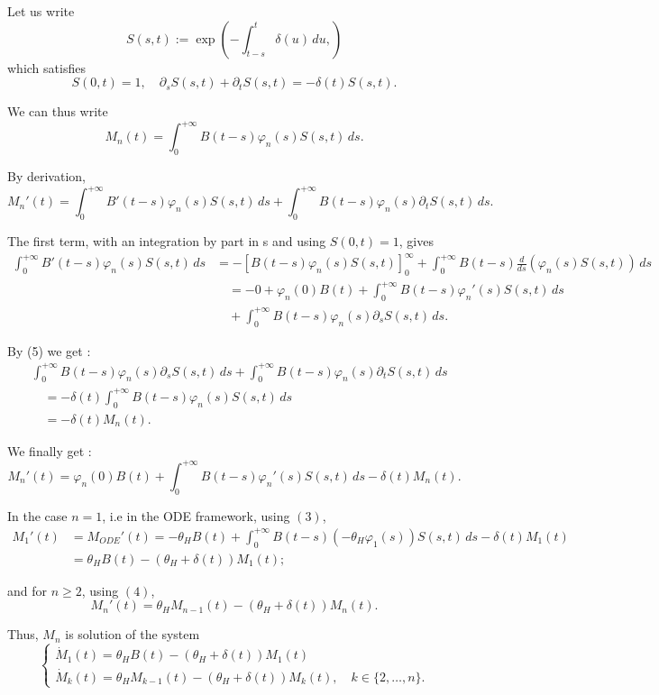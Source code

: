 \documentclass[12pt,a4paper,onecolumn]{article}
\begin{document}
Let us write 
\[
S(s, t) := \exp\left( -\int_{t-s}^{t} \delta(u) \, du, \right)
\]
which satisfies
\begin{equation}
S(0, t) = 1, \quad \partial_s S(s,t) + \partial_t S(s,t) = -\delta(t) S(s,t).
\end{equation}

We can thus write 
\[
M_n(t) = \int_0^{+\infty} B(t-s)\varphi_n(s)S(s,t) \, ds.
\]

By derivation,
\begin{equation}
M_n'(t) = \int_0^{+\infty} B'(t-s)\varphi_n(s)S(s,t) \, ds + \int_0^{+\infty} B(t-s)\varphi_n(s) \partial_t S(s,t) \, ds.
\end{equation}

The first term, with an integration by part in s and using $S(0,t) = 1$, gives
\begin{align*}
\int_0^{+\infty} B'(t-s)\varphi_n(s)S(s,t) \, ds &= -[B(t-s) \varphi_n(s) S(s,t) ]_{0}^{\infty} + \int_0^{+\infty} B(t-s)\frac{d}{ds}(\varphi_n(s)S(s,t)) \, ds \\
&\quad = -0 + \varphi_n(0) B(t) + \int_0^{+\infty} B(t-s)\varphi_n'(s) S(s,t) \, ds \\
&\quad + \int_0^{+\infty} B(t-s)\varphi_n(s) \partial_s S(s,t) \, ds.
\end{align*}

By (5) we get :
\begin{align*}
&\int_0^{+\infty} B(t-s)\varphi_n(s) \partial_s S(s,t) \, ds  + \int_0^{+\infty} B(t-s)\varphi_n(s) \partial_t S(s,t) \, ds \\
&\quad = - \delta(t) \int_0^{+\infty} B(t-s)\varphi_n(s) S(s,t)  \, ds \\
&\quad = - \delta(t) M_n(t).
\end{align*}

We finally get :
\[
M_n'(t) = \varphi_n(0) B(t) + \int_0^{+\infty} B(t-s)\varphi_n'(s) S(s,t) \, ds - \delta(t) M_n(t).
\]

In the case $n = 1$, i.e in the ODE framework, using $(3)$,
\begin{align*}
M_{1}'(t) &= M_{ODE}'(t)= -\theta_H B(t) + \int_0^{+\infty} B(t-s)(-\theta_H \varphi_1(s)) S(s,t) \, ds - \delta(t) M_1(t) \\
&= \theta_H B(t) - (\theta_H + \delta(t)) M_1(t) ;
\end{align*}

and for $n \geq 2$, using $(4)$,
\[
M_n'(t) = \theta_H M_{n-1}(t) - (\theta_H + \delta(t)) M_n(t).
\]

Thus, \(M_n\) is solution of the system 
\begin{equation}
\begin{cases}
\dot{M}_1(t) = \theta_H B(t) - (\theta_H + \delta(t)) M_1(t) \\
\dot{M}_k(t) = \theta_H M_{k-1}(t) - (\theta_H + \delta(t)) M_k(t), \quad k \in \{2, \dots, n\}.
\end{cases}
\end{equation}
\end{document}
